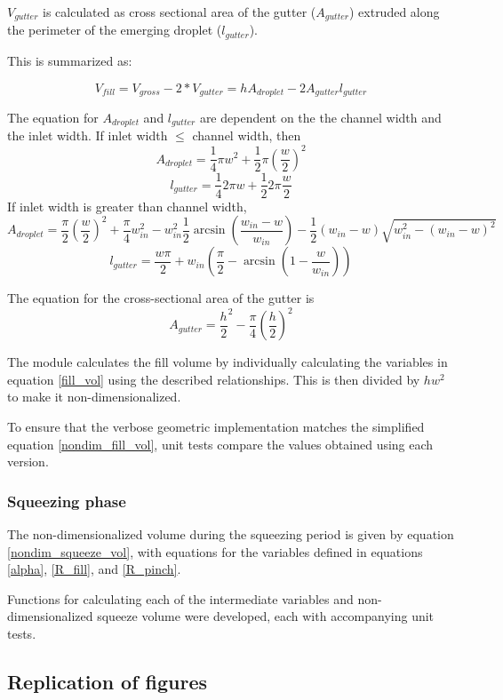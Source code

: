 $V_{gutter}$ is calculated as cross sectional area of the gutter ($A_{gutter}$) extruded along
the perimeter of the emerging droplet ($l_{gutter}$).

This is summarized as:

\begin{equation}
  V_{fill} = V_{gross} - 2*V_{gutter} = hA_{droplet} - 2A_{gutter}l_{gutter} \label{fill_vol}
\end{equation}

The equation for $A_{droplet}$ and $l_{gutter}$ are dependent on the the channel width and the inlet width. If inlet width $\leq$
channel width, then
$$A_{droplet} = \frac{1}{4}{\pi}w^2 + \frac{1}{2}{\pi}\left(\frac{w}{2}\right)^2$$
$$l_{gutter} = \frac{1}{4}2{\pi}w + \frac{1}{2}2{\pi}\frac{w}{2}$$
If inlet width is greater than channel width,
$$A_{droplet} = \frac{\pi}{2}\left(\frac{w}{2}\right)^2 +
\frac{\pi}{4}w_{in}^2 -
w_{in}^2\frac{1}{2}\arcsin{\left(\frac{w_{in}-w}{w_{in}}\right)} -
\frac{1}{2}\left(w_{in}-w\right)\sqrt{w_{in}^2 - \left(w_{in}-w\right)^2}$$
$$l_{gutter} = \frac{w\pi}{2}+w_{in}\left(\frac{\pi}{2}-\arcsin\left(1-\frac{w}{w_{in}}\right)\right)$$

\par
The equation for the cross-sectional area of the gutter is 
$$A_{gutter} = \frac{h}{2}^2-\frac{\pi}{4}\left(\frac{h}{2}\right)^2$$
\par

The module calculates the fill volume by individually calculating the variables in equation
\eqref{fill_vol} using the described relationships.
This is then divided by $hw^2$ to make it non-dimensionalized.

To ensure that the verbose geometric implementation matches the simplified equation \eqref{nondim_fill_vol}, 
unit tests compare the values obtained using each version.

\subsubsection{Squeezing phase}
The non-dimensionalized volume during the squeezing period is given by equation \eqref{nondim_squeeze_vol}, with
equations for the variables defined in equations \eqref{alpha}, \eqref{R_fill}, and \eqref{R_pinch}.

Functions for calculating each of the intermediate variables and non-dimensionalized squeeze volume
were developed, each with accompanying unit tests.

\subsection{Replication of figures}

